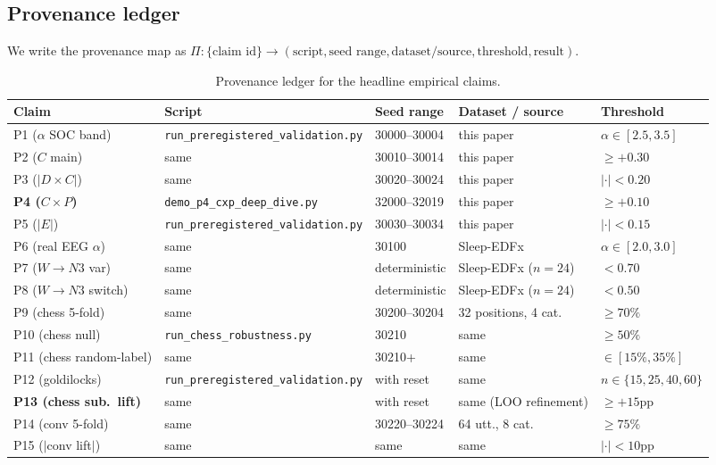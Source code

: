 \subsection{Provenance ledger}

We write the provenance map as $\Pi\colon\{\text{claim id}\}
\to (\text{script}, \text{seed range}, \text{dataset/source},
\text{threshold}, \text{result})$.

\begin{table}[ht]
\centering
\small
\caption{Provenance ledger for the headline empirical claims.}
\label{tab:provenance}
\begin{tabular}{l l l l l}
\toprule
Claim & Script & Seed range & Dataset / source & Threshold \\
\midrule
P1 ($\alpha$ SOC band) & \texttt{run\_preregistered\_validation.py} & 30000--30004 & this paper & $\alpha\in[2.5, 3.5]$ \\
P2 ($C$ main) & same & 30010--30014 & this paper & $\geq +0.30$ \\
P3 ($|D{\times}C|$) & same & 30020--30024 & this paper & $|\cdot| < 0.20$ \\
\textbf{P4 ($C{\times}P$)} & \texttt{demo\_p4\_cxp\_deep\_dive.py} & 32000--32019 & this paper & $\geq +0.10$ \\
P5 ($|E|$) & \texttt{run\_preregistered\_validation.py} & 30030--30034 & this paper & $|\cdot| < 0.15$ \\
P6 (real EEG $\alpha$) & same & 30100 & Sleep-EDFx~\citep{SleepEDFx} & $\alpha\in[2.0, 3.0]$ \\
P7 ($W{\to}N3$ var) & same & deterministic & Sleep-EDFx ($n=24$) & $<0.70$ \\
P8 ($W{\to}N3$ switch) & same & deterministic & Sleep-EDFx ($n=24$) & $<0.50$ \\
P9 (chess 5-fold) & same & 30200--30204 & 32 positions, 4 cat. & $\geq 70\%$ \\
P10 (chess null) & \texttt{run\_chess\_robustness.py} & 30210 & same & $\geq 50\%$ \\
P11 (chess random-label) & same & 30210+ & same & $\in [15\%, 35\%]$ \\
P12 (goldilocks) & \texttt{run\_preregistered\_validation.py} & with reset & same & $n\in\{15,25,40,60\}$ \\
\textbf{P13 (chess sub.\ lift)} & same & with reset & same (LOO refinement) & $\geq +15$pp \\
P14 (conv 5-fold) & same & 30220--30224 & 64 utt., 8 cat. & $\geq 75\%$ \\
P15 ($|$conv lift$|$) & same & same & same & $|\cdot| < 10$pp \\

\end{tabular}
\end{table}
